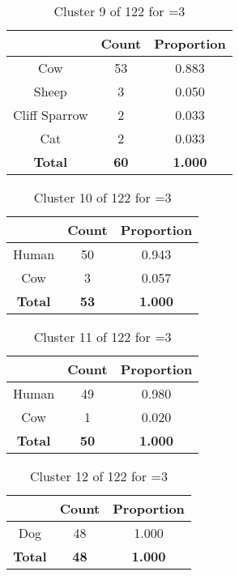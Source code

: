 \begin{table}[ht!]
\centering
\begin{tabular}{|c|c|c|}
\hline
\bf \Spec{} &\bf Count &\bf Proportion\\ \hline \hline
Cow & 53 & 0.883\\ \hline
Sheep & 3 & 0.050\\ \hline
Cliff Sparrow & 2 & 0.033\\ \hline
Cat & 2 & 0.033\\ \hline
\hline
\bf Total & \bf 60 & \bf 1.000\\ \hline
\end{tabular}
\label{tab:cluster:9:3}
\caption{Cluster 9 of 122 for \minneigh{}=3}
\end{table}

\clearpage
\begin{table}[ht!]
\centering
\begin{tabular}{|c|c|c|}
\hline
\bf \Spec{} &\bf Count &\bf Proportion\\ \hline \hline
Human & 50 & 0.943\\ \hline
Cow & 3 & 0.057\\ \hline
\hline
\bf Total & \bf 53 & \bf 1.000\\ \hline
\end{tabular}
\label{tab:cluster:10:3}
\caption{Cluster 10 of 122 for \minneigh{}=3}
\end{table}

\begin{table}[ht!]
\centering
\begin{tabular}{|c|c|c|}
\hline
\bf \Spec{} &\bf Count &\bf Proportion\\ \hline \hline
Human & 49 & 0.980\\ \hline
Cow & 1 & 0.020\\ \hline
\hline
\bf Total & \bf 50 & \bf 1.000\\ \hline
\end{tabular}
\label{tab:cluster:11:3}
\caption{Cluster 11 of 122 for \minneigh{}=3}
\end{table}

\begin{table}[ht!]
\centering
\begin{tabular}{|c|c|c|}
\hline
\bf \Spec{} &\bf Count &\bf Proportion\\ \hline \hline
Dog & 48 & 1.000\\ \hline
\hline
\bf Total & \bf 48 & \bf 1.000\\ \hline
\end{tabular}
\label{tab:cluster:12:3}
\caption{Cluster 12 of 122 for \minneigh{}=3}
\end{table}

